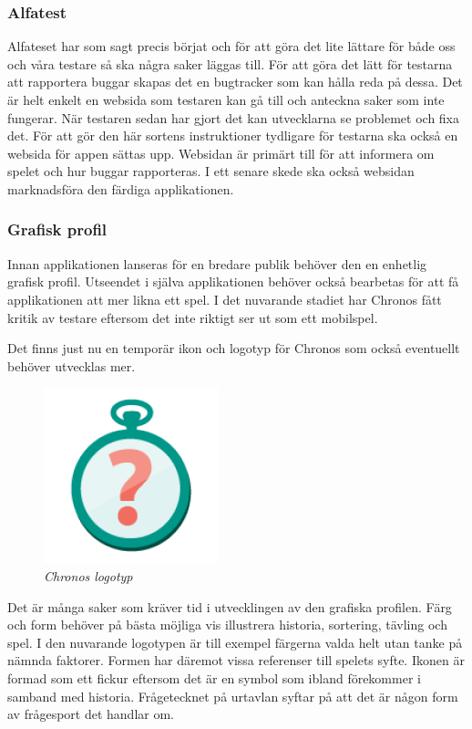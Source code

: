 \documentclass[a4paper, 11pt]{article}
\begin{document}
\subsubsection{Alfatest}
Alfateset har som sagt precis börjat och för att göra det lite lättare för både oss och våra testare så ska några saker läggas till. För att göra det lätt för testarna att rapportera buggar skapas det en bugtracker som kan hålla reda på dessa. Det är helt enkelt en websida som testaren kan gå till och anteckna saker som inte fungerar. När testaren sedan har gjort det kan utvecklarna se problemet och fixa det. För att gör den här sortens instruktioner tydligare för testarna ska också en websida för appen sättas upp. Websidan är primärt till för att informera om spelet och hur buggar rapporteras. I ett senare skede ska också websidan marknadsföra den färdiga applikationen.

\subsubsection{Grafisk profil}
Innan applikationen lanseras för en bredare publik behöver den en enhetlig grafisk profil. Utseendet i själva applikationen behöver också bearbetas för att få applikationen att mer likna ett spel. I det nuvarande stadiet har Chronos fått kritik av testare eftersom det inte riktigt ser ut som ett mobilspel. 

Det finns just nu en temporär ikon och logotyp för Chronos som också eventuellt behöver utvecklas mer.

\begin{figure}[H]
	\begin{center}
	\includegraphics[]{ic_launcher} 
	\end{center}
	\caption{\textit{Chronos logotyp}}
\end{figure}

Det är många saker som kräver tid i utvecklingen av den grafiska profilen. Färg och form behöver på bästa möjliga vis illustrera historia, sortering, tävling och spel. I den nuvarande logotypen är till exempel färgerna valda helt utan tanke på nämnda faktorer. Formen har däremot vissa referenser till spelets syfte. Ikonen är formad som ett fickur eftersom det är en symbol som ibland förekommer i samband med historia. Frågetecknet på urtavlan syftar på att det är någon form av frågesport det handlar om.
\end{document}

